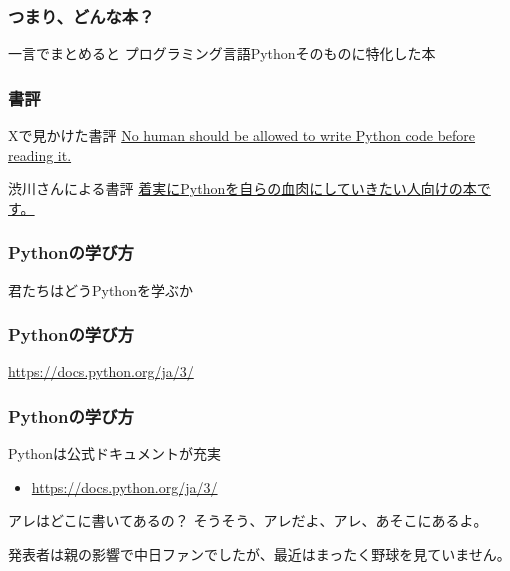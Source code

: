 \documentclass[aspectratio=169,dvipdfmx,12pt,notheorems]{beamer}
\theoremstyle{definition}
\begin{document}
\begin{frame}\frametitle{つまり、どんな本？}

\begin{block}{一言でまとめると}
プログラミング言語Pythonそのものに特化した本
\end{block}

\end{frame}

\begin{frame}\frametitle{書評}

\begin{block}{ Xで見かけた書評}
\href{https://twitter.com/jeanmarcalkazzi/status/1512161719585583112}{No human should be allowed to write Python code before reading it.}
\end{block}

\begin{block}{渋川さんによる書評}
\href{https://future-architect.github.io/articles/20231116a/}{着実にPythonを自らの血肉にしていきたい人向けの本です。}
\end{block}

\end{frame}

\begin{frame}\frametitle{Pythonの学び方}

\begin{center}
\Huge{君たちはどうPythonを学ぶか}
\end{center}

\end{frame}

\begin{frame}\frametitle{Pythonの学び方}

\begin{center}
\Huge{\url{https://docs.python.org/ja/3/}}
\end{center}

\end{frame}

\begin{frame}\frametitle{Pythonの学び方}

\begin{block}{Pythonは公式ドキュメントが充実}
\begin{itemize}
\item \url{https://docs.python.org/ja/3/}
\end{itemize}
\end{block}

\begin{alertblock}{アレはどこに書いてあるの？}
そうそう、アレだよ、アレ、あそこにあるよ。
\end{alertblock}
発表者は親の影響で中日ファンでしたが、最近はまったく野球を見ていません。

\end{frame}
\end{document}
